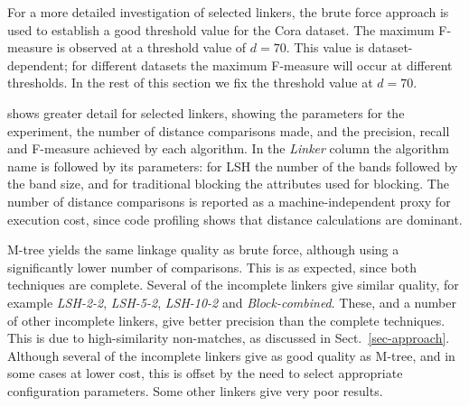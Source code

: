 \documentclass{llncs}
\begin{document}
For a more detailed investigation of selected linkers, the brute force
approach is used to establish a good threshold value for the Cora
dataset. The maximum F-measure is observed at a threshold value of
$d=70$. This value is dataset-dependent; for different datasets the
maximum F-measure will occur at different thresholds. In the rest of
this section we fix the threshold value at $d=70$.

 shows greater detail for selected
linkers, showing the parameters for the experiment, the number of
distance comparisons made, and the precision, recall and F-measure
achieved by each algorithm. In the \emph{Linker} column the algorithm
name is followed by its parameters: for LSH the number of the bands
followed by the band size, and for traditional blocking the attributes
used for blocking. The number of distance comparisons is reported as a
machine-independent proxy for execution cost, since code profiling
shows that distance calculations are dominant.

M-tree yields the same linkage quality as brute force, although using a
significantly lower number of comparisons. This is as expected, since
both techniques are complete. Several of the incomplete linkers give
similar quality, for example \emph{LSH-2-2}, \emph{LSH-5-2},
\emph{LSH-10-2} and \emph{Block-combined}. These, and a number of other
incomplete linkers, give better precision than the complete techniques.
This is due to high-similarity non-matches, as discussed in
Sect.~\ref{sec-approach}. Although several of the incomplete linkers
give as good quality as M-tree, and in some cases at lower cost, this is
offset by the need to select appropriate configuration parameters. Some
other linkers give very poor results.

\end{document}
